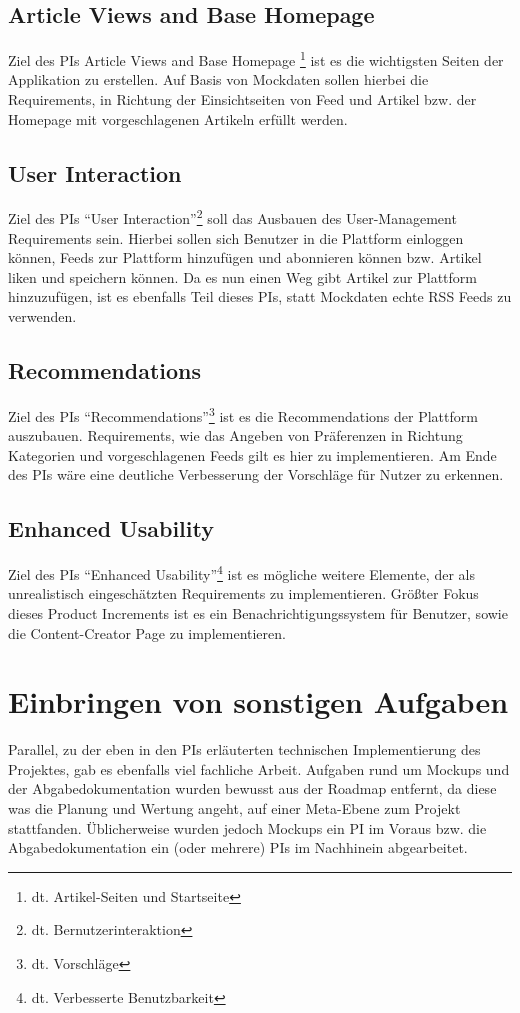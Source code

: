 \subsection{Article Views and Base Homepage}
Ziel des \acp{PI} \glqq Article Views and Base Homepage \grqq \footnote{dt. Artikel-Seiten und Startseite} ist es die wichtigsten Seiten der Applikation zu erstellen.
Auf Basis von Mockdaten sollen hierbei die Requirements, in Richtung der Einsichtseiten von Feed und Artikel bzw. der Homepage mit vorgeschlagenen Artikeln erfüllt werden.


\subsection{User Interaction}
Ziel des \acp{PI} \enquote{User Interaction}\footnote{dt. Bernutzerinteraktion} soll das Ausbauen des User-Management Requirements sein.
Hierbei sollen sich Benutzer in die Plattform einloggen können, Feeds zur Plattform hinzufügen und abonnieren können bzw. Artikel liken und speichern können.
Da es nun einen Weg gibt Artikel zur Plattform hinzuzufügen, ist es ebenfalls Teil dieses \acp{PI}, statt Mockdaten echte RSS Feeds zu verwenden.

\subsection{Recommendations}
Ziel des \acp{PI} \enquote{Recommendations}\footnote{dt. Vorschläge} ist es die Recommendations der Plattform auszubauen.
Requirements, wie das Angeben von Präferenzen in Richtung Kategorien und vorgeschlagenen Feeds gilt es hier zu implementieren.
Am Ende des \acp{PI} wäre eine deutliche Verbesserung der Vorschläge für Nutzer zu erkennen.

\subsection{Enhanced Usability}
Ziel des \acp{PI} \enquote{Enhanced Usability}\footnote{dt. Verbesserte Benutzbarkeit} ist es mögliche weitere Elemente, der als unrealistisch eingeschätzten Requirements zu implementieren.
Größter Fokus dieses Product Increments ist es ein Benachrichtigungssystem für Benutzer, sowie die Content-Creator Page zu implementieren.

\section{Einbringen von sonstigen Aufgaben}
Parallel, zu der eben in den \acp{PI} erläuterten technischen Implementierung des Projektes, gab es ebenfalls viel fachliche Arbeit.
Aufgaben rund um Mockups und der Abgabedokumentation wurden bewusst aus der Roadmap entfernt, da diese was die Planung und Wertung angeht, auf einer Meta-Ebene zum Projekt stattfanden.
Üblicherweise wurden jedoch Mockups ein \ac{PI} im Voraus bzw. die Abgabedokumentation ein (oder mehrere) \acp{PI} im Nachhinein abgearbeitet.
